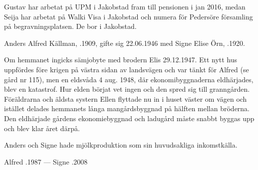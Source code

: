 Gustav har arbetat på UPM i Jakobstad fram till pensionen i jan 2016, medan Seija har arbetat på Walki Visa i Jakobstad och numera för Pedersöre församling på begravningsplatsen. De bor i Jakobstad.
\begin{jhchildren}
  \item {}
  \item {}
\end{jhchildren}


%
Anders Alfred Källman, .1909, gifte sig 22.06.1946 med Signe Elise Örn, .1920.

Om hemmanet ingicks sämjobyte med brodern Elis 29.12.1947. Ett nytt hus uppfördes före krigen på västra sidan av landsvägen och var tänkt för Alfred (se gård nr 115), men en eldsvåda 4 aug. 1948, där ekonomibyggnaderna eldhärjades, blev en katastrof. Hur elden börjat vet ingen och den spred sig till granngården. Föräldrarna och äldsta systern Ellen flyttade nu in i huset väster om vägen och istället delades hemmanets långa mangårdsbyggnad på hälften mellan bröderna. Den eldhärjade gårdens ekonomiebyggnad och ladugård måste snabbt byggas upp och blev klar året därpå.

Anders och Signe hade mjölkproduktion som sin huvudsakliga inkomstkälla.
\begin{jhchildren}
  \item {}
  \item {}
\end{jhchildren}

Alfred .1987  ---  Signe .2008


